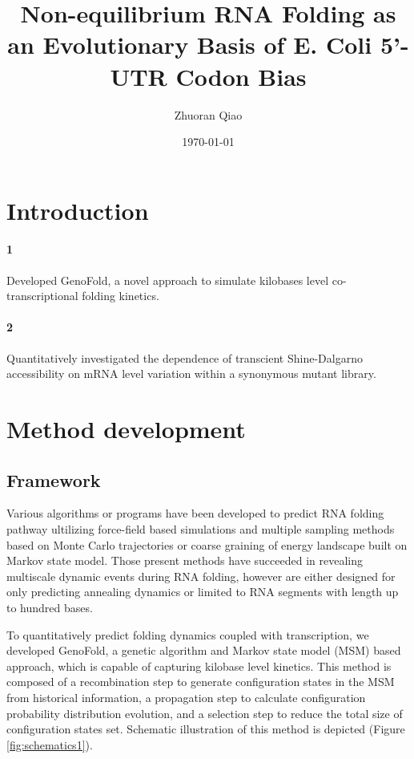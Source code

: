 \documentclass[11pt, a4paper]{article}
\begin{document}
\title{Non-equilibrium RNA Folding as an Evolutionary Basis of E. Coli 5'-UTR Codon Bias}
\author{Zhuoran Qiao}
\date{\today}

\maketitle

\section{Introduction}

\paragraph{1} Developed GenoFold, a novel approach to simulate kilobases level co-transcriptional folding kinetics.
\paragraph{2} Quantitatively investigated the dependence of transcient Shine-Dalgarno accessibility on mRNA level variation within a synonymous mutant library.


\section{Method development}
\subsection{Framework}
Various algorithms or programs have been developed to predict RNA folding pathway ultilizing force-field based simulations\cite{RaviprasadAduri2007}
and multiple sampling methods based on Monte Carlo trajectories\cite{Gultyaev1995}\cite{Clote} or coarse graining of energy landscape built on Markov state model\cite{Wolfinger}\cite{Sun2018}. Those present methods have succeeded in revealing multiscale dynamic events during RNA folding, however are either designed for only predicting annealing dynamics or limited to RNA segments with length up to hundred bases.

To quantitatively predict folding dynamics coupled with transcription, we developed GenoFold, a genetic algorithm and Markov state model (MSM) based approach, which is capable of capturing kilobase level kinetics. This method is composed of a recombination step to generate configuration states in the MSM from historical information, a propagation step to calculate configuration probability distribution evolution, and a selection step to reduce the total size of configuration states set. Schematic illustration of this method is depicted (Figure \ref{fig:schematics1}).
\end{document}
